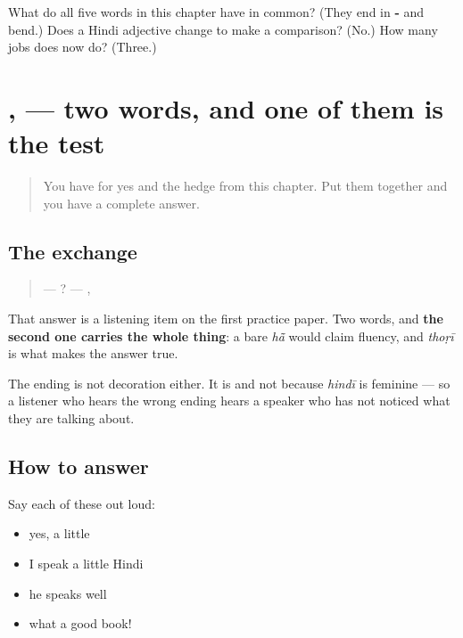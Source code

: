 \begin{tcolorbox}[breakable,colback=teal!4,colframe=teal!35!black,title={Before you move on}]
What do all five words in this chapter have in common? (They end in \textbf{-} and bend.) Does a Hindi adjective change to make a comparison? (No.) How many jobs does \textbf{} now do? (Three.)
\end{tcolorbox}
\section[\texorpdfstring{\hi{हाँ}, \hi{थोड़ी} (hā̃, thoṛī)}{हाँ, थोड़ी (hā̃, thoṛī)}]{,  — two words, and one of them is the test}

\label{lesson:HI-C92-sintesis-maatra}



\begin{quote}
You have \textbf{} for yes and the hedge from this chapter. Put them together and you have a complete answer.
\end{quote}

\subsection*{The exchange}
\begin{quote}
—     ? — , 
\end{quote}

That answer is a listening item on the first practice paper. Two words, and \textbf{the second one carries the whole thing}: a bare \emph{hā̃} would claim fluency, and \emph{thoṛī} is what makes the answer true.

The ending is not decoration either. It is \textbf{} and not \textbf{} because \emph{hindī} is feminine — so a listener who hears the wrong ending hears a speaker who has not noticed what they are talking about.

\subsection*{How to answer}
Say each of these out loud:

\begin{itemize}
\raggedright
  \item yes, a little
  \item I speak a little Hindi
  \item he speaks well
  \item what a good book!
\end{itemize}

